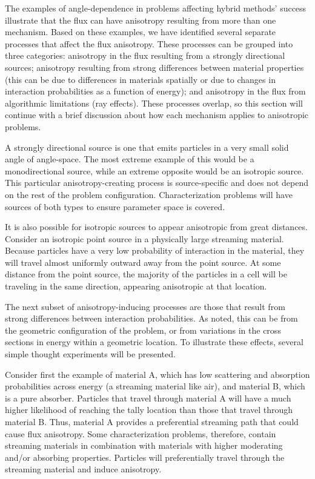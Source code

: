 The examples of angle-dependence in problems affecting hybrid methods' success
illustrate that the flux can have anisotropy resulting from more than one
mechanism. Based on these examples, we have identified several separate
processes that affect the flux anisotropy. These processes can be grouped into
three categories: anisotropy in the flux resulting from a strongly
directional sources; anisotropy resulting from strong differences between
material properties (this can be due to differences in
materials spatially or due to changes in interaction probabilities as a function of energy);
and anisotropy in the flux from algorithmic limitations (ray effects).
These processes overlap, so this section will continue with a brief discussion about how each
mechanism applies to anisotropic problems.

A strongly directional source is one that emits particles in a very small solid
angle of angle-space. The most extreme example of this would be a
monodirectional source, while an extreme opposite would be an isotropic source.
This particular anisotropy-creating process
is source-specific and does not depend on the rest of the
problem configuration. Characterization problems will have sources of both types
to ensure parameter space is covered.

It is also possible for isotropic sources to appear anisotropic from great distances. 
Consider an isotropic
point source in a physically large streaming material. 
Because particles have a very low
probability of interaction in the material, they will travel almost uniformly
outward away from the point source. At some distance from the point source, the
majority of the
particles in a cell will be traveling in the same direction, appearing anisotropic at that location.

The next subset of anisotropy-inducing processes are those that result from
strong differences between interaction probabilities. As noted, this can be from
the geometric configuration of the problem, or from variations in the cross
sections in energy within a geometric location. To illustrate these effects, several simple thought
experiments will be presented. 

Consider first the example of material
A, which has low scattering and absorption probabilities across energy (a streaming material like air),
and material B, which is a pure absorber. 
Particles that travel through material A will have a much higher likelihood of reaching the tally
location than those that travel through material B. 
Thus, material A provides a preferential streaming path that could cause flux anisotropy. Some characterization problems, therefore, contain streaming materials in combination with materials with higher moderating and/or absorbing properties. Particles will preferentially travel through the streaming material and induce anisotropy. 

